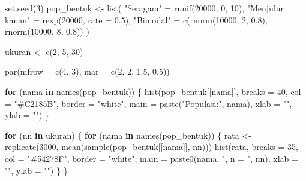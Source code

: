 \documentclass[
  indonesian,
  letterpaper,
]{book}
\newenvironment{Shaded}{\begin{snugshade}}{\end{snugshade}}
\newcommand{\AttributeTok}[1]{\textcolor[rgb]{0.40,0.45,0.13}{#1}}
\newcommand{\ControlFlowTok}[1]{\textcolor[rgb]{0.00,0.23,0.31}{\textbf{#1}}}
\newcommand{\DecValTok}[1]{\textcolor[rgb]{0.68,0.00,0.00}{#1}}
\newcommand{\FloatTok}[1]{\textcolor[rgb]{0.68,0.00,0.00}{#1}}
\newcommand{\FunctionTok}[1]{\textcolor[rgb]{0.28,0.35,0.67}{#1}}
\newcommand{\NormalTok}[1]{\textcolor[rgb]{0.00,0.23,0.31}{#1}}
\newcommand{\OtherTok}[1]{\textcolor[rgb]{0.00,0.23,0.31}{#1}}
\newcommand{\StringTok}[1]{\textcolor[rgb]{0.13,0.47,0.30}{#1}}
\begin{document}
\begin{Shaded}
\begin{Highlighting}[]
\FunctionTok{set.seed}\NormalTok{(}\DecValTok{3}\NormalTok{)}
\NormalTok{pop\_bentuk }\OtherTok{\textless{}{-}} \FunctionTok{list}\NormalTok{(}
  \StringTok{"Seragam"}        \OtherTok{=} \FunctionTok{runif}\NormalTok{(}\DecValTok{20000}\NormalTok{, }\DecValTok{0}\NormalTok{, }\DecValTok{10}\NormalTok{),}
  \StringTok{"Menjulur kanan"} \OtherTok{=} \FunctionTok{rexp}\NormalTok{(}\DecValTok{20000}\NormalTok{, }\AttributeTok{rate =} \FloatTok{0.5}\NormalTok{),}
  \StringTok{"Bimodal"}        \OtherTok{=} \FunctionTok{c}\NormalTok{(}\FunctionTok{rnorm}\NormalTok{(}\DecValTok{10000}\NormalTok{, }\DecValTok{2}\NormalTok{, }\FloatTok{0.8}\NormalTok{), }\FunctionTok{rnorm}\NormalTok{(}\DecValTok{10000}\NormalTok{, }\DecValTok{8}\NormalTok{, }\FloatTok{0.8}\NormalTok{))}
\NormalTok{)}

\NormalTok{ukuran }\OtherTok{\textless{}{-}} \FunctionTok{c}\NormalTok{(}\DecValTok{2}\NormalTok{, }\DecValTok{5}\NormalTok{, }\DecValTok{30}\NormalTok{)}

\FunctionTok{par}\NormalTok{(}\AttributeTok{mfrow =} \FunctionTok{c}\NormalTok{(}\DecValTok{4}\NormalTok{, }\DecValTok{3}\NormalTok{), }\AttributeTok{mar =} \FunctionTok{c}\NormalTok{(}\DecValTok{2}\NormalTok{, }\DecValTok{2}\NormalTok{, }\FloatTok{1.5}\NormalTok{, }\FloatTok{0.5}\NormalTok{))}

\ControlFlowTok{for}\NormalTok{ (nama }\ControlFlowTok{in} \FunctionTok{names}\NormalTok{(pop\_bentuk)) \{}
  \FunctionTok{hist}\NormalTok{(pop\_bentuk[[nama]], }\AttributeTok{breaks =} \DecValTok{40}\NormalTok{, }\AttributeTok{col =} \StringTok{"\#C2185B"}\NormalTok{, }\AttributeTok{border =} \StringTok{"white"}\NormalTok{,}
       \AttributeTok{main =} \FunctionTok{paste}\NormalTok{(}\StringTok{"Populasi:"}\NormalTok{, nama), }\AttributeTok{xlab =} \StringTok{""}\NormalTok{, }\AttributeTok{ylab =} \StringTok{""}\NormalTok{)}
\NormalTok{\}}

\ControlFlowTok{for}\NormalTok{ (nn }\ControlFlowTok{in}\NormalTok{ ukuran) \{}
  \ControlFlowTok{for}\NormalTok{ (nama }\ControlFlowTok{in} \FunctionTok{names}\NormalTok{(pop\_bentuk)) \{}
\NormalTok{    rata }\OtherTok{\textless{}{-}} \FunctionTok{replicate}\NormalTok{(}\DecValTok{3000}\NormalTok{, }\FunctionTok{mean}\NormalTok{(}\FunctionTok{sample}\NormalTok{(pop\_bentuk[[nama]], nn)))}
    \FunctionTok{hist}\NormalTok{(rata, }\AttributeTok{breaks =} \DecValTok{35}\NormalTok{, }\AttributeTok{col =} \StringTok{"\#54278F"}\NormalTok{, }\AttributeTok{border =} \StringTok{"white"}\NormalTok{,}
         \AttributeTok{main =} \FunctionTok{paste0}\NormalTok{(nama, }\StringTok{", n = "}\NormalTok{, nn), }\AttributeTok{xlab =} \StringTok{""}\NormalTok{, }\AttributeTok{ylab =} \StringTok{""}\NormalTok{)}
\NormalTok{  \}}
\NormalTok{\}}
\end{Highlighting}
\end{Shaded}
\end{document}
